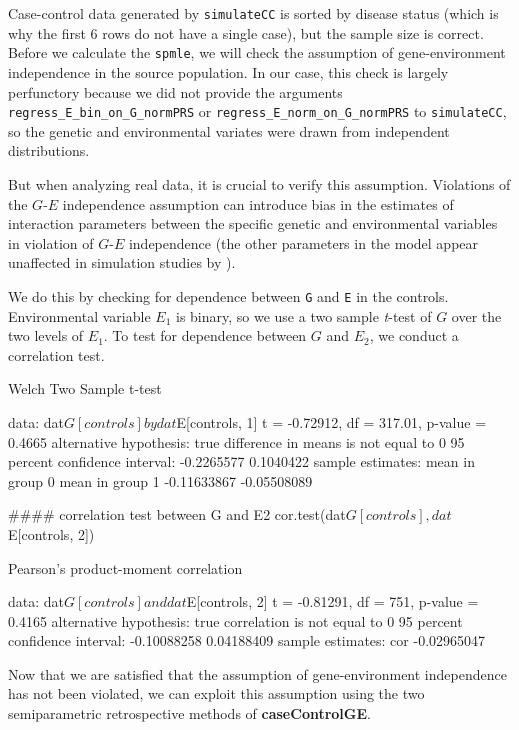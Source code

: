 \documentclass{article}\usepackage[]{graphicx}\usepackage[]{color}
\def\code#1{\texttt{#1}}
\def\pkg#1{\textbf{#1}}
\begin{document}
Case-control data generated by \code{simulateCC} is sorted by disease status (which is why the first 6 rows do not have a single case), but the sample size is correct.  Before we calculate the \code{spmle}, we will check the assumption of gene-environment independence in the source population.  In our case, this check is largely perfunctory because we did not provide the arguments \code{regress\_E\_bin\_on\_G\_normPRS} or \code{regress\_E\_norm\_on\_G\_normPRS} to \code{simulateCC}, so the genetic and environmental variates were drawn from independent distributions.

But when analyzing real data, it is crucial to verify this assumption.  Violations of the $G$-$E$ independence assumption can introduce bias in the estimates of interaction parameters between the specific genetic and environmental variables in violation of $G$-$E$ independence (the other parameters in the model appear unaffected in simulation studies by \citeauthor{Stalder2017}).

We do this by checking for dependence between \code{G} and \code{E} in the controls.  Environmental variable $E_1$ is binary, so we use a two sample \emph{t}-test of $G$ over the two levels of $E_1$.  To test for dependence between $G$ and $E_2$, we conduct a correlation test.
\begin{Schunk}
\begin{Soutput}

	Welch Two Sample t-test

data:  dat$G[controls] by dat$E[controls, 1]
t = -0.72912, df = 317.01, p-value = 0.4665
alternative hypothesis: true difference in means is not equal to 0
95 percent confidence interval:
 -0.2265577  0.1040422
sample estimates:
mean in group 0 mean in group 1 
    -0.11633867     -0.05508089 
\end{Soutput}
\begin{Sinput}
#### correlation test between G and E2
cor.test(dat$G[controls], dat$E[controls, 2])
\end{Sinput}
\begin{Soutput}

	Pearson's product-moment correlation

data:  dat$G[controls] and dat$E[controls, 2]
t = -0.81291, df = 751, p-value = 0.4165
alternative hypothesis: true correlation is not equal to 0
95 percent confidence interval:
 -0.10088258  0.04188409
sample estimates:
        cor 
-0.02965047 
\end{Soutput}
\end{Schunk}
Now that we are satisfied that the assumption of gene-environment independence has not been violated, we can exploit this assumption using the two semiparametric retrospective methods of \pkg{caseControlGE}.
\end{document}
